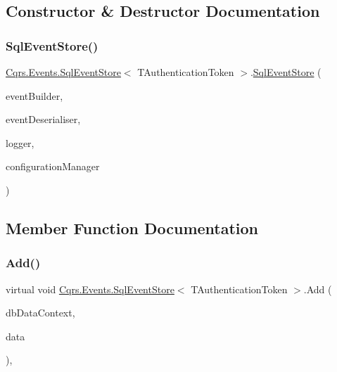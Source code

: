 \subsection{Constructor \& Destructor Documentation}
\mbox{\label{classCqrs_1_1Events_1_1SqlEventStore_a15df78a1b12d2e3035b9715e9bfc8535}} 
\subsubsection{\texorpdfstring{Sql\+Event\+Store()}{SqlEventStore()}}
{\footnotesize\ttfamily \hyperlink{classCqrs_1_1Events_1_1SqlEventStore}{Cqrs.\+Events.\+Sql\+Event\+Store}$<$ T\+Authentication\+Token $>$.\hyperlink{classCqrs_1_1Events_1_1SqlEventStore}{Sql\+Event\+Store} (\begin{DoxyParamCaption}\item[{\hyperlink{interfaceCqrs_1_1Events_1_1IEventBuilder}{I\+Event\+Builder}$<$ T\+Authentication\+Token $>$}]{event\+Builder,  }\item[{\hyperlink{interfaceCqrs_1_1Events_1_1IEventDeserialiser}{I\+Event\+Deserialiser}$<$ T\+Authentication\+Token $>$}]{event\+Deserialiser,  }\item[{I\+Logger}]{logger,  }\item[{\hyperlink{interfaceCqrs_1_1Configuration_1_1IConfigurationManager}{I\+Configuration\+Manager}}]{configuration\+Manager }\end{DoxyParamCaption})}



\subsection{Member Function Documentation}
\mbox{\label{classCqrs_1_1Events_1_1SqlEventStore_a94ce64c00db57e5b9dbd10f74a4cef5b}} 
\subsubsection{\texorpdfstring{Add()}{Add()}}
{\footnotesize\ttfamily virtual void \hyperlink{classCqrs_1_1Events_1_1SqlEventStore}{Cqrs.\+Events.\+Sql\+Event\+Store}$<$ T\+Authentication\+Token $>$.Add (\begin{DoxyParamCaption}\item[{Data\+Context}]{db\+Data\+Context,  }\item[{\hyperlink{classCqrs_1_1Events_1_1EventData}{Event\+Data}}]{data }\end{DoxyParamCaption})\hspace{0.3cm}{\ttfamily [protected]}, {\ttfamily [virtual]}}

